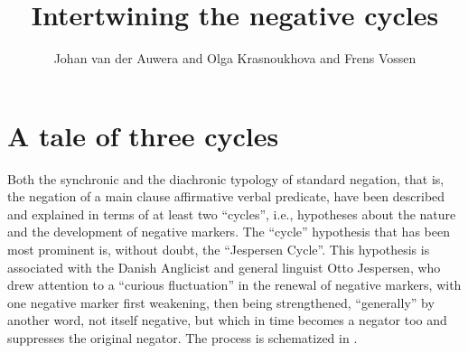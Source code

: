﻿\documentclass[output=paper,draft,draftmode,colorlinks,citecolor=brown]{langscibook}
\title{Intertwining the negative cycles}
\author{Johan van der Auwera\affiliation{University of Antwerp} and Olga Krasnoukhova\affiliation{University of Antwerp} and Frens Vossen\affiliation{University of Antwerp}
}
\begin{document}
\maketitle

\section{A tale of three cycles}\label{sec:int-1}

Both the synchronic and the diachronic typology of standard negation, that is,
the negation of a main clause affirmative verbal predicate, have been
described and explained in terms of at least two ``cycles'',  i.e., hypotheses
about the nature and the development of negative markers. The ``cycle''
hypothesis that has been most prominent is, without doubt, the
``Jespersen Cycle''. This hypothesis is associated with the Danish Anglicist
and general linguist Otto Jespersen, who drew attention to a ``curious
fluctuation'' \parencite[4]{Jespersen1917} in the renewal of negative markers,
with one negative marker first weakening, then being strengthened,
``generally'' by another word, not itself negative, but which in time becomes
a negator too and suppresses the original negator. The process is
schematized in . 
\end{document}
